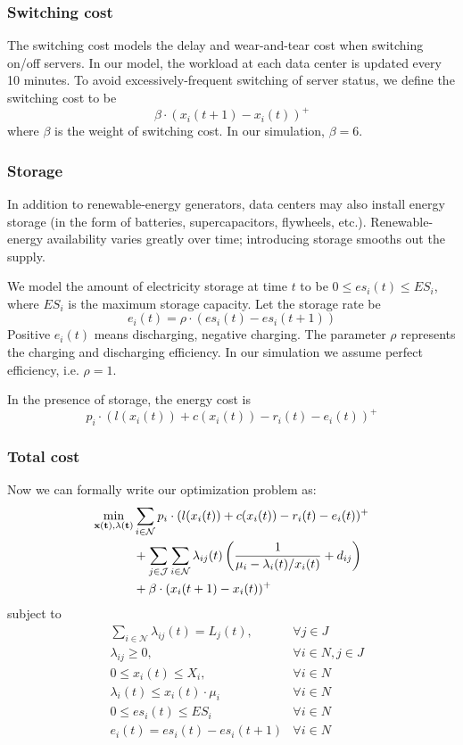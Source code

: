 \documentclass{acm_proc_article-sp}
\begin{document}
\subsubsection{Switching cost}
The switching cost models the delay and wear-and-tear cost when switching on/off servers. In our model, the workload at each data center is updated every 10 minutes. To avoid excessively-frequent switching of server status, we define the switching cost to be
$$\beta \cdot (x_i(t+1) - x_i(t))^+$$
where $\beta$ is the weight of switching cost. In our simulation, $\beta = 6$.

\subsubsection{Storage}
In addition to renewable-energy generators, data centers may also install energy storage (in the form of batteries, supercapacitors, flywheels, etc.). Renewable-energy availability varies greatly over time; introducing storage smooths out the supply.

We model the amount of electricity storage at time $t$ to be $0 \leq es_i(t) \leq ES_i$, where $ES_i$ is the maximum storage capacity. Let the storage rate be
$$e_i(t) = \rho \cdot (es_i(t) - es_i(t+1))$$
Positive $e_i(t)$ means discharging, negative charging. The parameter $\rho$ represents the charging and discharging efficiency. In our simulation we assume perfect efficiency, i.e. $\rho = 1$.

In the presence of storage, the energy cost is
\begin{equation}
p_i \cdot (l(x_i(t)) + c(x_i(t)) - r_i(t) - e_i(t))^+
\end{equation}

\subsubsection{Total cost}
Now we can formally write our optimization problem as:
\begin{align*}
\min_{\bf{x}(t), \bf{\lambda}(t)} & \sum_{i \in \mathcal{N}} p_i \cdot (l(x_i(t)) + c(x_i(t)) - r_i(t) - e_i(t))^+ \\
& + \sum_{j \in \mathcal{J}}\sum_{i \in \mathcal{N}}
\lambda_{ij}(t)\left(\frac{1}{\mu_i - \lambda_i(t)/x_i(t)} + d_{ij}\right) \\
& + \beta \cdot (x_i(t+1) - x_i(t))^+
\end{align*}
subject to
\begin{align*}
& \sum_{i\in \mathcal{N}}\lambda_{ij}(t) = L_j(t), &\forall j\in J \\
& \lambda_{ij} \geq 0, & \forall i\in N, j\in J \\
& 0 \leq x_i(t) \leq X_i, & \forall i \in N \\
& \lambda_i(t) \leq x_i(t) \cdot \mu_i & \forall i \in N \\
& 0 \leq es_i(t) \leq ES_i & \forall i \in N \\
& e_i(t) = es_i(t) - es_i(t+1) & \forall i \in N
\end{align*}
\end{document}
